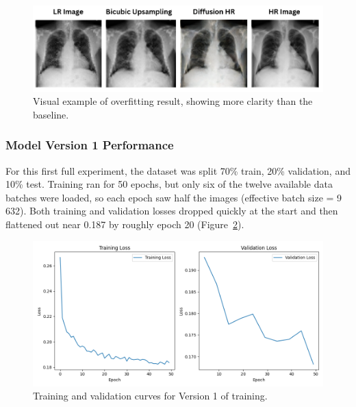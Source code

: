 \documentclass{article} %
\begin{document}
\begin{figure}[h]
\begin{center}
\includegraphics[width=1\textwidth]{progress/Figs/overfit.png}
\end{center}
\caption{Visual example of overfitting result, showing more clarity than the baseline.}
\label{overfit}
\end{figure}

\subsubsection{Model Version 1 Performance}

For this first full experiment, the dataset was split 70\% train, 20\% validation, and 10\% test. Training ran for 50 epochs, but only six of the twelve available data batches were loaded, so each epoch saw half the images (effective batch size = 9\,632). Both training and validation losses dropped quickly at the start and then flattened out near 0.187 by roughly epoch 20 (Figure~\ref{v1loss}).

\begin{figure}[h]
\begin{center}
\includegraphics[width=1\textwidth]{progress/Figs/trainv1loss.png}
\end{center}
\caption{Training and validation curves for Version 1 of training.}
\label{v1loss}
\end{figure}
\end{document}
